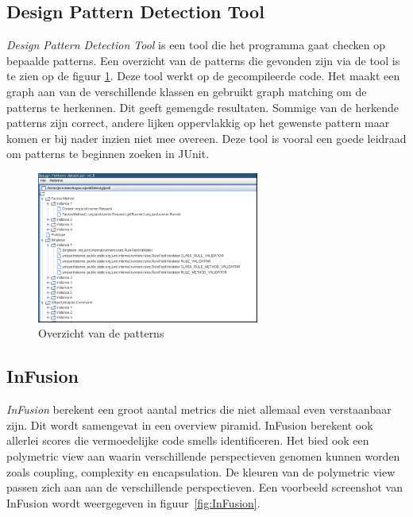 \documentclass[i1]{oss}
\begin{document}
\subsection{Design Pattern Detection Tool}
\emph{Design Pattern Detection Tool} is een tool die het programma gaat checken op bepaalde patterns. Een overzicht van de patterns die gevonden zijn via de tool is te zien op de figuur \ref{fig:DesignPatterns}. Deze tool werkt op de gecompileerde code. Het maakt een graph aan van de verschillende klassen en gebruikt graph matching om de patterns te herkennen.  Dit geeft gemengde resultaten. Sommige van de herkende patterns zijn correct, andere lijken oppervlakkig op het gewenste pattern maar komen er bij nader inzien niet mee overeen. 
Deze tool is vooral een goede leidraad om patterns te beginnen zoeken in JUnit.\\

\begin{figure}[h!]
	\centering
	\includegraphics[width=0.65\textwidth]{Patterns1}
	\caption{Overzicht van de patterns}
	\label{fig:DesignPatterns}
\end{figure}

\subsection{InFusion}
\emph{InFusion} berekent een groot aantal metrics die niet allemaal even verstaanbaar zijn. Dit wordt samengevat in een overview piramid. InFusion berekent ook allerlei scores die vermoedelijke code smells identificeren. Het bied ook een polymetric view aan waarin verschillende perspectieven genomen kunnen worden zoals coupling, complexity en encapsulation. De kleuren van de polymetric view passen zich aan aan de verschillende perspectieven. Een voorbeeld screenshot van InFusion wordt weergegeven in figuur~\ref{fig:InFusion}.
\end{document}
